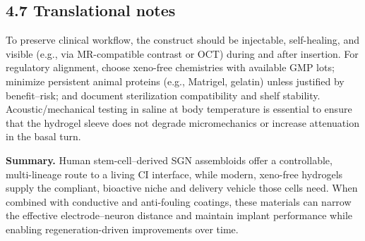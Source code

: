 \subsection*{4.7 Translational notes}
To preserve clinical workflow, the construct should be injectable, self-healing, and visible (e.g., via MR-compatible contrast or OCT) during and after insertion. For regulatory alignment, choose xeno-free chemistries with available GMP lots; minimize persistent animal proteins (e.g., Matrigel, gelatin) unless justified by benefit–risk; and document sterilization compatibility and shelf stability. Acoustic/mechanical testing in saline at body temperature is essential to ensure that the hydrogel sleeve does not degrade micromechanics or increase attenuation in the basal turn.

\medskip
\noindent\textbf{Summary.} Human stem-cell–derived SGN assembloids offer a controllable, multi-lineage route to a living CI interface, while modern, xeno-free hydrogels supply the compliant, bioactive niche and delivery vehicle those cells need. When combined with conductive and anti-fouling coatings, these materials can narrow the effective electrode–neuron distance and maintain implant performance while enabling regeneration-driven improvements over time.
